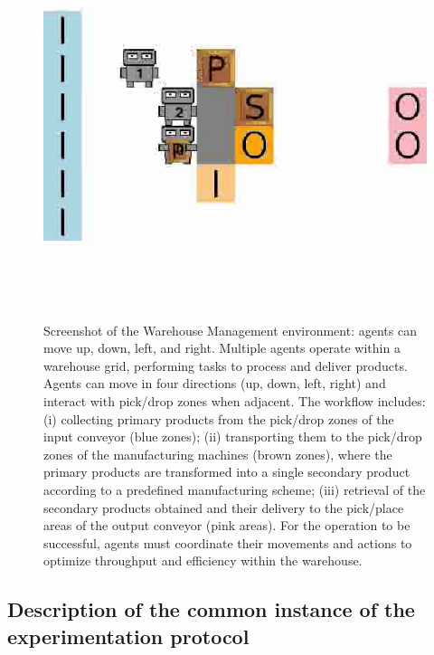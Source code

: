\begin{figure}[h!]
\centering
\includegraphics[trim=0cm 3cm 0cm 3cm, clip, width=0.9\linewidth]{figures/wm.png}
\caption[Screenshot of the Warehouse Management environment]{Screenshot of the Warehouse Management environment: agents can move up, down, left, and right. Multiple agents operate within a warehouse grid, performing tasks to process and deliver products. Agents can move in four directions (up, down, left, right) and interact with pick/drop zones when adjacent. The workflow includes: (i) collecting primary products from the pick/drop zones of the input conveyor (blue zones); (ii) transporting them to the pick/drop zones of the manufacturing machines (brown zones), where the primary products are transformed into a single secondary product according to a predefined manufacturing scheme; (iii) retrieval of the secondary products obtained and their delivery to the pick/place areas of the output conveyor (pink areas). For the operation to be successful, agents must coordinate their movements and actions to optimize throughput and efficiency within the warehouse.}
\label{fig:warehouse}
\end {figure}



\subsection{Description of the common instance of the experimentation protocol}

